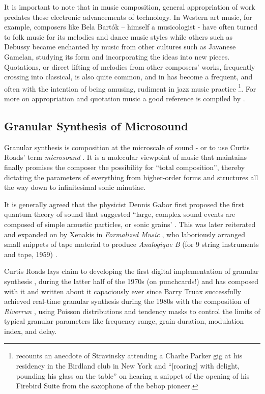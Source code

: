 It is important to note that in music composition, general appropriation of work predates these electronic advancements of technology. In Western art music, for example, composers like Bela Bartók – himself a musicologist - have often turned to folk music for its melodies and dance music styles \citep{Bartok1993} while others such as Debussy \citep{Tamagawa1988} became enchanted by music from other cultures such as Javanese Gamelan, studying its form and incorporating the ideas into new pieces. Quotations, or direct lifting of melodies from other composers’ works, frequently crossing into classical, is also quite common, and in has become a frequent, and often with the intention of being amusing, rudiment in jazz music practice \citep{Mangani2006}\footnote{\cite{Appel2002} recounts an anecdote of Stravinsky attending a Charlie Parker gig at his residency in the Birdland club in New York and ``[roaring] with delight, pounding his glass on the table'' on hearing a snippet of the opening of his Firebird Suite from the saxophone of the bebop pioneer.}.  For more on appropriation and quotation music a good reference is compiled by \cite{Metzer2003}.

\subsection{Granular Synthesis of Microsound}

Granular synthesis is composition at the microscale of sound - or to use Curtis Roads' term \textit{microsound} \citep{Roads2004}. It is a molecular viewpoint of music that \cite{Thomson2004} maintains finally promises the composer the possibility for ``total composition'', thereby dictating the parameters of everything from higher-order forms and structures all the way down to infinitesimal sonic minutiae.

It is generally agreed that the physicist Dennis Gabor first proposed the first quantum theory of sound that suggested ``large, complex sound events are composed of simple acoustic particles, or sonic grains' \citep{Miranda1995}. This was later reiterated and expanded on by Xenakis in \textit{Formalized Music} \citep{Bradshaw1973}, who laboriously arranged small snippets of tape material to produce \textit{Analogique B} (for 9 string instruments and tape, 1959) \citep{Robindore2009}.

Curtis Roads lays claim to developing the first digital implementation of granular synthesis \citep{Roads1998}, during the latter half of the 1970s (on punchcards!) and has composed with it and written about it capaciously ever since \citep{Roads1985, Roads1991, Roads1996, Roads2004} Barry Truax successfully achieved real-time granular synthesis during the 1980s with the composition of \textit{Riverrun} \citep{Truax1998}, using Poisson distributions and tendency masks to control the limits of typical granular parameters like frequency range, grain duration, modulation index, and delay.

